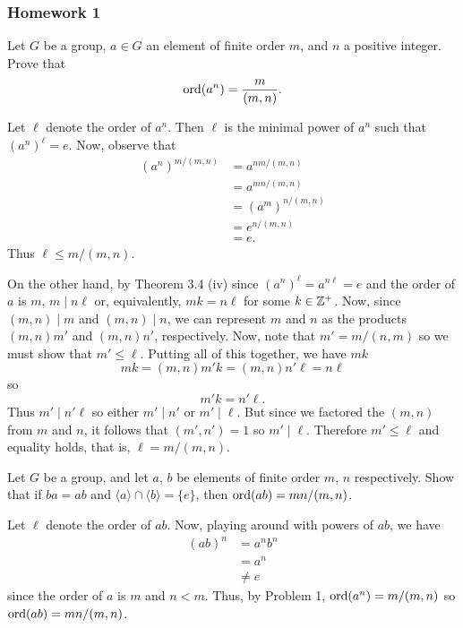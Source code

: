 \newpage

\subsubsection{Homework 1}
\setcounter{exercise}{0}
\setcounter{equation}{0}

\begin{problem}
  Let \(G\) be a group, \(a\in G\) an element of finite order \(m\), and
  \(n\) a positive integer. Prove that
  \[
    \operatorname{ord}(a^n)=\frac{m}{(m,n)}.
  \]
\end{problem}
\begin{solution}
  Let \(\ell\) denote the order of \(a^n\). Then \(\ell\) is the minimal
  power of \(a^n\) such that \({(a^n)}^\ell=e\). Now, observe that
    \begin{align*}
      {(a^n)}^{m/(m,n)}
      &=a^{nm/(m,n)}\\
      &=a^{mn/(m,n)}\\
      &={(a^m)}^{n/(m,n)}\\
      &=e^{n/(m,n)}\\
      &=e.
    \end{align*}
    Thus \(\ell\leq m/(m,n)\).

    On the other hand, by Theorem 3.4 (iv) since
    \({(a^n)}^\ell=a^{n\ell}=e\) and the order of \(a\) is \(m\),
    \(m\mid n\ell\) or, equivalently, \(mk=n\ell\) for some
    \(k\in\mathbb{Z}^+\). Now, since \((m,n)\mid m\) and \((m,n)\mid n\), we can
    represent \(m\) and \(n\) as the products \((m,n)m'\) and \((m,n)n'\),
    respectively. Now, note that \(m'=m/(n,m)\) so we must show that
    \(m'\leq\ell\). Putting all of this together, we have \(mk\)
  \[
    mk=(m,n)m'k=(m,n)n'\ell=n\ell
  \]
  so
  \[
    m'k=n'\ell.
  \]
  Thus \(m'\mid n'\ell\) so either \(m'\mid n'\) or \(m'\mid\ell\). But
  since we factored the \((m,n)\) from \(m\) and \(n\), it follows that
  \((m',n')=1\) so \(m'\mid \ell\). Therefore \(m'\leq\ell\) and equality
  holds, that is, \(\ell=m/(m,n)\).
\end{solution}

\begin{problem}
  Let \(G\) be a group, and let \(a\), \(b\) be elements of finite order
  \(m\), \(n\) respectively. Show that if \(ba=ab\) and
  \(\langle a\rangle\cap\langle b\rangle=\{e\}\), then
  \(\operatorname{ord}(ab)=mn/(m,n)\).
\end{problem}
\begin{solution}
  Let \(\ell\) denote the order of \(ab\). Now, playing around with powers
  of \(ab\), we have
  \begin{align*}
    (ab)^{n}
    &=a^nb^n\\
    &=a^n\\
    &\neq e
  \end{align*}
  since the order of \(a\) is \(m\) and \(n<m\). Thus, by Problem 1,
  \(\operatorname{ord}(a^n)=m/(m,n)\) so \(\operatorname{ord}(ab)=mn/(m,n)\).
\end{solution}

